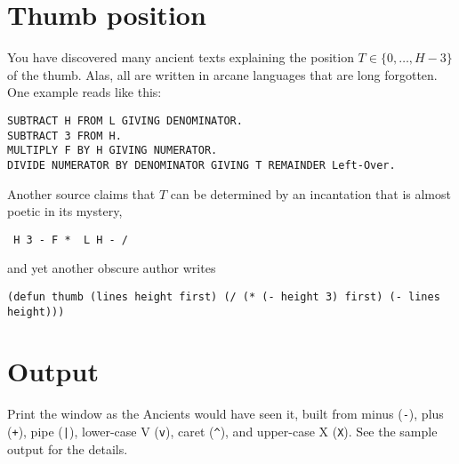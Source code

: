 \section*{Thumb position}
You have discovered many ancient texts explaining the position $T\in\{0,\ldots, H-3\}$ of the thumb. 
Alas, all are written in arcane languages that are long forgotten.
One example reads like this:
\begin{verbatim}
SUBTRACT H FROM L GIVING DENOMINATOR.
SUBTRACT 3 FROM H.
MULTIPLY F BY H GIVING NUMERATOR.
DIVIDE NUMERATOR BY DENOMINATOR GIVING T REMAINDER Left-Over.
\end{verbatim}
Another source claims that $T$ can be determined by an incantation that is almost poetic in its mystery, 
\begin{verbatim}
 H 3 - F *  L H - /
\end{verbatim}
and yet another obscure author writes
\begin{verbatim}
(defun thumb (lines height first) (/ (* (- height 3) first) (- lines height)))
\end{verbatim}

\section*{Output}

Print the window as the Ancients would have seen it, built from minus (\verb!-!), plus (\verb!+!), pipe (\verb!|!), lower-case V (\verb!v!), caret (\verb!^!), and upper-case X (\verb!X!).
See the sample output for the details.

